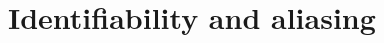 \documentclass[aap]{imsart}
\newcommand{\reals}{{\mathbb R}}
\begin{document}




\section{Identifiability and aliasing}\label{sec:ident_aliasing}
\end{document}
